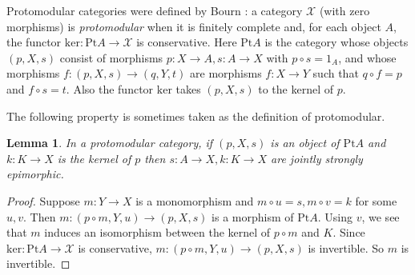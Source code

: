 \documentclass[a4paper,12pt,reqno]{amsart}
\newtheorem{lemma}[theorem]{Lemma}
\theoremstyle{definition}
\theoremstyle{fact}
\theoremstyle{genquest}
\theoremstyle{step}
\newcommand{\ra}{\rightarrow}
\def\CX{{\mathscr X}}
\begin{document}
Protomodular categories were defined by Bourn \cite{Bourn91}:
a category $\CX$ (with zero morphisms) is {\em protomodular} when 
it is finitely complete and, for each object $A$, 
the functor $\mathrm{ker}: \mathrm{Pt}A\ra \CX$ is conservative. 
Here $\mathrm{Pt}A$ is the category
whose objects $(p,X,s)$ consist of morphisms $p:X\ra A, s:A\ra X$ with
$p\circ s = 1_A$, and whose morphisms $f:(p,X,s)\ra (q,Y,t)$ are morphisms
$f:X\ra Y$ such that $q\circ f = p$ and $f\circ s = t$.
Also the functor $\mathrm{ker}$ takes $(p,X,s)$ to the kernel of $p$.

The following property is sometimes \cite{BorBou07} taken as the definition of protomodular.  

\begin{lemma}\label{protolemma} 
In a protomodular category, if $(p,X,s)$ is an object of 
$\mathrm{Pt}A$ and $k:K\ra X$
is the kernel of $p$ then $s:A\ra X, k:K\ra X$ are jointly strongly epimorphic.
\end{lemma}
\begin{proof} Suppose $m:Y\ra X$ is a monomorphism and $m\circ u = s, m\circ v = k$ for some $u,v$. Then $m:(p\circ m,Y,u)\ra (p,X,s)$ is a morphism of
$\mathrm{Pt}A$. Using $v$, we see that $m$ induces an isomorphism between
the kernel of $p\circ m$ and $K$. Since $\mathrm{ker}: \mathrm{Pt}A\ra \CX$
is conservative, $m:(p\circ m,Y,u)\ra (p,X,s)$ is invertible. So $m$ is invertible.   
\end{proof}      
\end{document}
